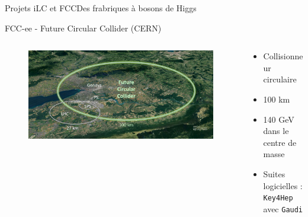\documentclass[9pt]{beamer}
\begin{document}
\begin{frame}{Projets iLC et FCC}{Des frabriques à bosons de Higgs}
\begin{block}{FCC-ee - Future Circular Collider (CERN)}
\begin{columns}
            \begin{column}{0.45\textwidth}
                \begin{figure}
                    \includegraphics[width=\textwidth]{../img/FCC.jpg}
                \end{figure}
            \end{column}
            
            \begin{column}{0.45\textwidth}
                \begin{itemize}
                    \item Collisionneur circulaire
                    \item 100 km
                    \item 140 GeV dans le centre de masse
                    \item Suites logicielles : \texttt{Key4Hep} avec \texttt{Gaudi} 
                \end{itemize}
            \end{column}
            
        \end{columns}
    \end{block}
    
\end{frame}

\end{document}
